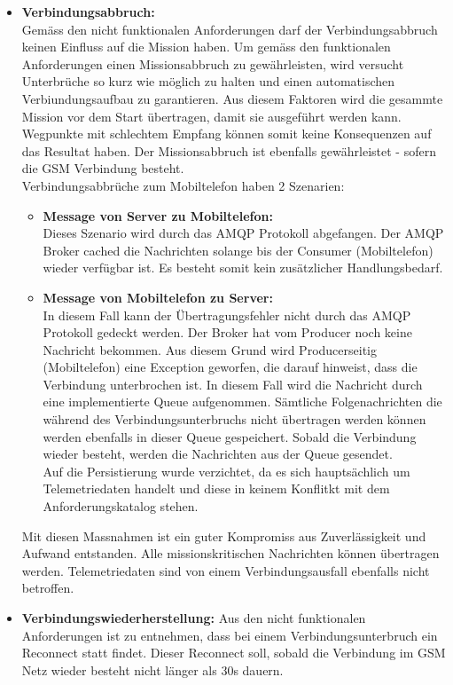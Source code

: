\begin{itemize}
	\item{\textbf{Verbindungsabbruch:} \\
	Gemäss den nicht funktionalen Anforderungen darf der Verbindungsabbruch keinen Einfluss auf die Mission haben. Um gemäss den funktionalen Anforderungen einen Missionsabbruch zu gewährleisten, wird versucht Unterbrüche so kurz wie möglich zu halten und einen automatischen Verbiundungsaufbau zu garantieren. Aus diesem Faktoren wird die gesammte Mission vor dem Start übertragen, damit sie ausgeführt werden kann. Wegpunkte mit schlechtem Empfang können somit keine Konsequenzen auf das Resultat haben. Der Missionsabbruch ist ebenfalls gewährleistet - sofern die GSM Verbindung besteht. 
	\\
	Verbindungsabbrüche zum Mobiltelefon haben 2 Szenarien:	
	\begin{itemize}
		\item{\textbf{Message von Server zu Mobiltelefon:} \\
		Dieses Szenario wird durch das AMQP Protokoll abgefangen. Der AMQP Broker cached die Nachrichten solange bis der Consumer (Mobiltelefon) wieder verfügbar ist. Es besteht somit kein zusätzlicher Handlungsbedarf.
		}
		\item{\textbf{Message von Mobiltelefon zu Server:} \\
		In diesem Fall kann der Übertragungsfehler nicht durch das AMQP Protokoll gedeckt werden. Der Broker hat vom Producer noch keine Nachricht bekommen. Aus diesem Grund wird Producerseitig (Mobiltelefon) eine Exception geworfen, die darauf hinweist, dass die Verbindung unterbrochen ist. In diesem Fall wird die Nachricht durch eine implementierte Queue aufgenommen. Sämtliche Folgenachrichten die während des Verbindungsunterbruchs nicht übertragen werden können werden ebenfalls in dieser Queue gespeichert. Sobald die Verbindung wieder besteht, werden die Nachrichten aus der Queue gesendet. \\
		Auf die Persistierung wurde verzichtet, da es sich hauptsächlich um Telemetriedaten handelt und diese in keinem Konflitkt mit dem Anforderungskatalog stehen.
		}
	\end{itemize}
	Mit diesen Massnahmen ist ein guter Kompromiss aus Zuverlässigkeit und Aufwand entstanden. Alle missionskritischen Nachrichten können übertragen werden. Telemetriedaten sind von einem Verbindungsausfall ebenfalls nicht betroffen.
	}
	\item{\textbf{Verbindungswiederherstellung:}
	Aus den nicht funktionalen Anforderungen ist zu entnehmen, dass bei einem Verbindungsunterbruch ein Reconnect statt findet. Dieser Reconnect soll, sobald die Verbindung im GSM Netz wieder besteht nicht länger als 30s dauern. \\
}
\end{itemize}
